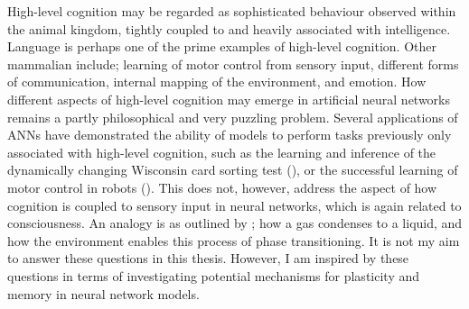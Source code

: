 High-level cognition may be regarded as sophisticated behaviour observed within the animal kingdom, tightly coupled to and heavily associated with intelligence. Language is perhaps one of the prime examples of high-level cognition. Other mammalian include; learning of motor control from sensory input, different forms of communication, internal mapping of the environment, and emotion.
How different aspects of high-level cognition may emerge in artificial neural networks remains a partly philosophical and very puzzling problem. Several applications of ANNs have demonstrated the ability of models to perform tasks previously only associated with high-level cognition, such as the learning and inference of the dynamically changing Wisconsin card sorting test (\cite{Maniadakis2012}), or the successful learning of motor control in robots (\cite{Sugita2005, Yamashita2008, Tani2014}). 
This does not, however, address the aspect of how cognition is coupled to sensory input in neural networks, which is again related to consciousness. An analogy is as outlined by \cite{Freeman2003}; how a gas condenses to a liquid, and how the environment enables this process of phase transitioning.
It is not my aim to answer these questions in this thesis. However, I am inspired by these questions in terms of investigating potential mechanisms for plasticity and memory in neural network models.
\\

